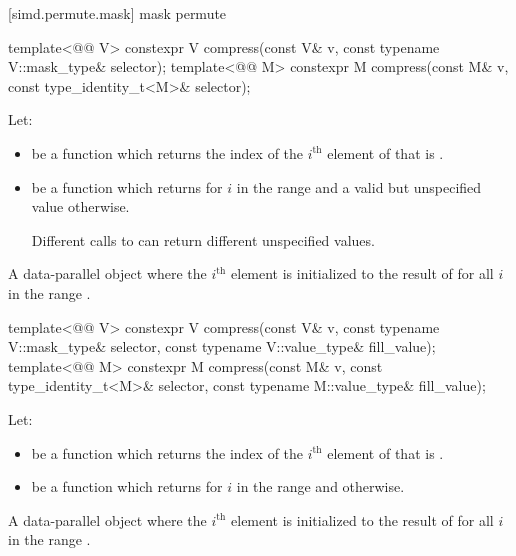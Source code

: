 [simd.permute.mask]{ mask permute}

\begin{itemdecl}
template<@@ V>
  constexpr V compress(const V& v, const typename V::mask_type& selector);
template<@@ M>
  constexpr M compress(const M& v, const type_identity_t<M>& selector);
\end{itemdecl}

\begin{itemdescr}
\pnum
Let:
\begin{itemize}
\item
{} be a function which returns the index
of the $i^\text{th}$ element of  that is .
\item
{} be a function which returns
 for $i$ in the range
 and a valid but unspecified value
otherwise.
\begin{note}
Different calls to  can return different unspecified values.
\end{note}
\end{itemize}

\pnum
\returns
A data-parallel object where the $i^\text{th}$
element is initialized to the result of 
for all $i$ in the range .
\end{itemdescr}

\begin{itemdecl}
template<@@ V>
  constexpr V compress(const V& v, const typename V::mask_type& selector,
                       const typename V::value_type& fill_value);
template<@@ M>
  constexpr M compress(const M& v, const type_identity_t<M>& selector,
                       const typename M::value_type& fill_value);
\end{itemdecl}

\begin{itemdescr}
\pnum
Let:
\begin{itemize}
\item
{} be a function which returns the index
of the $i^\text{th}$ element of  that is .
\item
{} be a function which returns
 for $i$ in the range
 and  otherwise.
\end{itemize}

\pnum
\returns
A data-parallel object where the $i^\text{th}$
element is initialized to the result of 
for all $i$ in the range .
\end{itemdescr}

